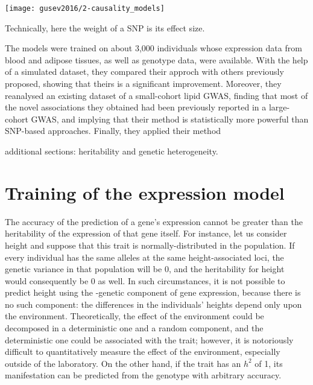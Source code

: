 \documentclass[../main.tex]{subfiles}
\begin{document}
\begin{marginfigure}[-2cm]
	\texttt{[image: gusev2016/2-causality\_models]}
	\caption{}
\end{marginfigure}

Technically, here the weight of a SNP is its effect size.

The models were trained on about 3,000 individuals whose expression data 
from blood and adipose tissues, as well as genotype data, were 
available. With the help of a simulated dataset, they compared their 
approch with others previously proposed, showing that theirs is a 
significant improvement. Moreover, they reanalysed an existing dataset 
of a small-cohort lipid GWAS, finding that most of the novel 
associations they obtained had been previously reported in a 
large-cohort GWAS, and implying that their method is statistically more 
powerful than SNP-based approaches. Finally, they applied their method 

additional sections: heritability and genetic heterogeneity.

\section{Training of the expression model}

The accuracy of the prediction of a gene's expression cannot be greater 
than the heritability 
of the expression of that gene itself. For instance, let us consider 
height and suppose that this trait is 
normally-distributed in the population. If every individual has the same 
alleles at the same height-associated loci, the genetic variance in that 
population will be 0, and the heritability for height would consequently 
be 0 as well. In such circumstances, it is not possible to predict 
height using the \cis-genetic component of gene expression, because 
there is no such component: the differences in the individuals' heights 
depend only upon the environment. Theoretically, the effect of the 
environment could be decomposed in a deterministic one and a random 
component, and the deterministic one could be associated with the trait; 
however, it is notoriously difficult to quantitatively measure the 
effect of the environment, especially outside of the laboratory. On the 
other hand, if the trait has an $h^2$ of 1, its manifestation can be 
predicted from the genotype with arbitrary accuracy.
\end{document}
